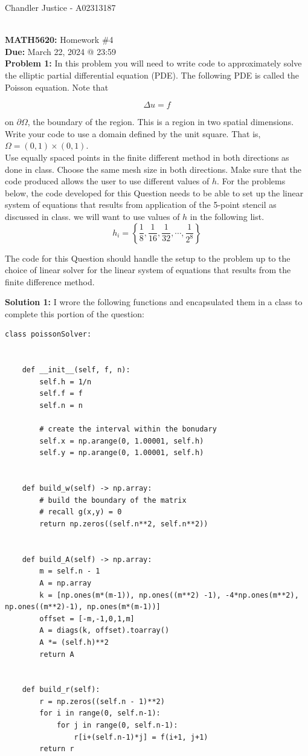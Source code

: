 \documentclass[10pt]{article}
\newcommand{\1}{\mathbb{1}}
\begin{document}
\begin{flushright}
Chandler Justice - A02313187
\end{flushright}
\noindent \underline{\hspace{3in}}\\
\textbf{MATH5620:} Homework \#4 \\
\textbf{Due:} March 22, 2024 @ 23:59\\

\textbf{Problem 1:} In this problem you will need to write code to approximately solve the elliptic partial differential equation (PDE). The following PDE is called the Poisson equation. Note that

\[\Delta u = f\]

on $\partial\Omega$, the boundary of the region. This is a region in two spatial dimensions. Write your code to use a domain defined by the unit square. That is, $\Omega = (0,1) \times (0,1)$.\\

Use equally spaced points in the finite different method in both directions as done in class. Choose the same mesh size in both directions. Make sure that the code produced allows the user to use different values of $h$. For the problems below, the code developed for this Question needs to be able to set up the linear system of equations that results from application of the 5-point stencil as discussed in class. we will want to use values of $h$ in the following list.
\[h_i = \left\{\frac{1}{8}, \frac{1}{16}, \frac{1}{32}, \cdots, \frac{1}{2^8}\right\}\]

The code for this Question should handle the setup to the problem up to the choice of linear solver for the linear system of equations that results from the finite difference method.

\textbf{Solution 1:} I wrore the following functions and encapsulated them in a class to complete this portion of the question:

\begin{verbatim}
class poissonSolver:


    def __init__(self, f, n):
        self.h = 1/n
        self.f = f
        self.n = n
        
        # create the interval within the bonudary
        self.x = np.arange(0, 1.00001, self.h)
        self.y = np.arange(0, 1.00001, self.h)


    def build_w(self) -> np.array:
        # build the boundary of the matrix
        # recall g(x,y) = 0
        return np.zeros((self.n**2, self.n**2))


    def build_A(self) -> np.array:
        m = self.n - 1
        A = np.array
        k = [np.ones(m*(m-1)), np.ones((m**2) -1), -4*np.ones(m**2), np.ones((m**2)-1), np.ones(m*(m-1))] 
        offset = [-m,-1,0,1,m]
        A = diags(k, offset).toarray()
        A *= (self.h)**2
        return A


    def build_r(self):
        r = np.zeros((self.n - 1)**2)
        for i in range(0, self.n-1):
            for j in range(0, self.n-1):
                r[i+(self.n-1)*j] = f(i+1, j+1)
        return r


\end{verbatim}
\end{document}
